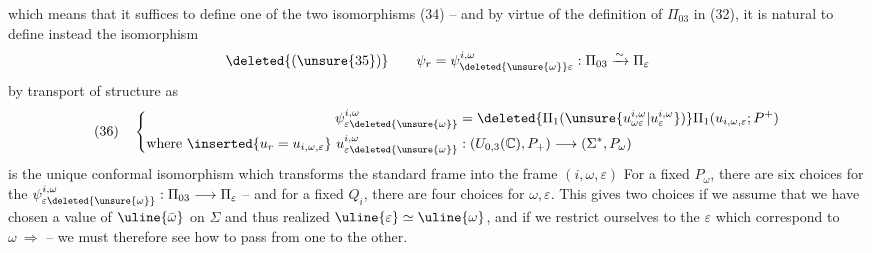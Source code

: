 which means that it suffices to define one of the two isomorphisms (34) -- and by virtue of the definition of $\Pi_{03}$ in (32), it is natural to define instead the isomorphism
\[
\deleted{(\unsure{35})}\qquad\psi_r=\psi_{\deleted{\unsure{\omega}}\varepsilon}^{i,\omega}:\Pi_{03}\xrightarrow{\sim}\Pi_\varepsilon
\]
by transport of structure as
\[
(36)\quad\left\{\begin{aligned}
\psi_{\varepsilon\deleted{\unsure{\omega}}}^{i,\omega}&=\deleted{\Pi_1(\unsure{u_{\omega\varepsilon}^{i,\omega}|u_\varepsilon^{i,\omega}})}\Pi_1(u_{i,\omega,\varepsilon};P^+)\\
\text{where }\inserted{u_r=u_{i,\omega,\varepsilon}}\ u_{\varepsilon\deleted{\unsure{\omega}}}^{i,\omega}&:(U_{0,3}(\mathbb C),P_+)\longrightarrow(\Sigma^*,P_\omega)
\end{aligned}\right.
\]
is the unique conformal isomorphism which transforms the  standard frame   into the frame  $(i,\omega,\varepsilon)$
For a fixed $P_\omega$, there are six choices for the  $\psi_{\varepsilon\deleted{\unsure{\omega}}}^{i,\omega}:\Pi_{03}\longrightarrow\Pi_\varepsilon$ -- and for a fixed $Q_i$, there are four choices for $\omega,\varepsilon$. This gives  two choices if we assume that we have chosen a value of $\uline{\bar\omega}$ on $\Sigma$ and thus realized $\uline{\varepsilon}\simeq\uline{\omega}$, and if we restrict ourselves to the $\varepsilon$ which correspond to $\omega\ \Rightarrow$ -- we must therefore see how to pass from one  to the other.
